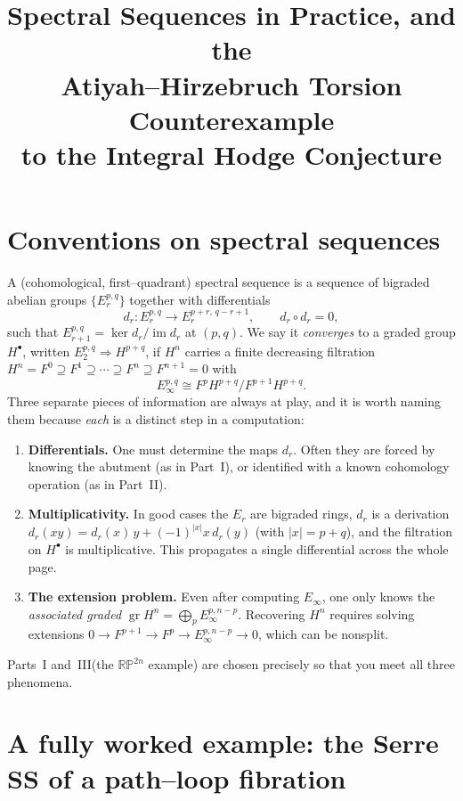 \documentclass[11pt]{article}
\title{Spectral Sequences in Practice, and the\\ Atiyah--Hirzebruch Torsion Counterexample\\ to the Integral Hodge Conjecture}
\author{}
\date{}
\theoremstyle{definition}
\newcommand{\RP}{\mathbb{RP}}
\newcommand{\gr}{\operatorname{gr}}
\begin{document}
\maketitle
\tableofcontents

\section{Conventions on spectral sequences}

A (cohomological, first--quadrant) spectral sequence is a sequence of bigraded
abelian groups $\{E_r^{p,q}\}$ together with differentials
\[
  d_r \colon E_r^{p,q}\to E_r^{p+r,\,q-r+1}, \qquad d_r\circ d_r=0,
\]
such that $E_{r+1}^{p,q}=\ker d_r/\operatorname{im} d_r$ at $(p,q)$. We say it
\emph{converges} to a graded group $H^\bullet$, written $E_2^{p,q}\Rightarrow
H^{p+q}$, if $H^n$ carries a finite decreasing filtration
$H^n=F^0\supseteq F^1\supseteq\cdots\supseteq F^{n}\supseteq F^{n+1}=0$ with
\[
  E_\infty^{p,q}\cong F^p H^{p+q}/F^{p+1}H^{p+q}.
\]
Three separate pieces of information are always at play, and it is worth naming
them because \emph{each} is a distinct step in a computation:

\begin{enumerate}
\item[(D)] \textbf{Differentials.} One must determine the maps $d_r$. Often they
are forced by knowing the abutment (as in Part~I), or identified with a known
cohomology operation (as in Part~II).
\item[(M)] \textbf{Multiplicativity.} In good cases the $E_r$ are bigraded rings,
$d_r$ is a derivation
$d_r(xy)=d_r(x)\,y+(-1)^{|x|}x\,d_r(y)$ (with $|x|=p+q$), and the filtration on
$H^\bullet$ is multiplicative. This propagates a single differential across the
whole page.
\item[(E)] \textbf{The extension problem.} Even after computing $E_\infty$, one
only knows the \emph{associated graded} $\gr H^n=\bigoplus_p E_\infty^{p,n-p}$.
Recovering $H^n$ requires solving extensions
$0\to F^{p+1}\to F^{p}\to E_\infty^{p,n-p}\to 0$, which can be nonsplit.
\end{enumerate}

Parts~I and~III(the $\RP^{2n}$ example) are chosen precisely so that you meet all
three phenomena.

\section{A fully worked example: the Serre SS of a path--loop fibration}
\end{document}
